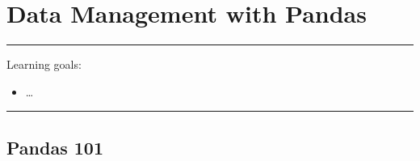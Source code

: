 \documentclass[a4paper,11pt]{book}
\numberwithin{figure}{chapter}
\numberwithin{table}{chapter}
\begin{document}
\theendnotes

\chapter{Data Management with Pandas}
\label{ch:data_management}

\par\noindent\rule{\textwidth}{0.4pt}

Learning goals:

\begin{itemize}
	\item \dots
\end{itemize}

\par\noindent\rule{\textwidth}{0.4pt}

\section{Pandas 101}
\end{document}
